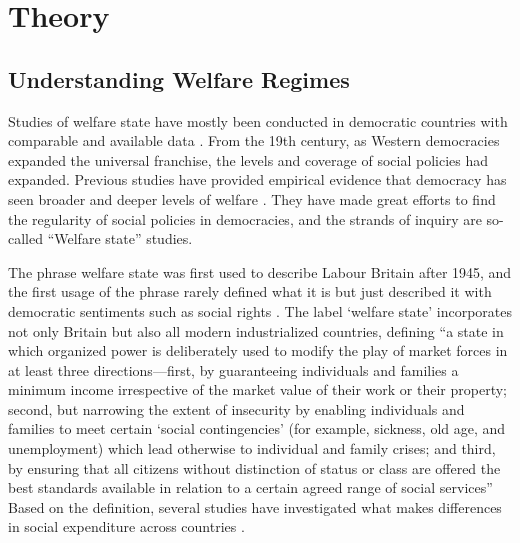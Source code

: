 \documentclass[11pt]{article}
\begin{document}
\section{Theory} 
\subsection{Understanding Welfare Regimes} 
Studies of welfare state have mostly been conducted in democratic countries with comparable and available data \citep{Jessop1984, Gosta1989, Gosta1990, Rudra2005, Huber2008, Hudson2009}. From the 19th century, as Western democracies expanded the universal franchise, the levels and coverage of social policies had expanded. Previous studies have provided empirical evidence that democracy has seen broader and deeper levels of welfare \citep{Acemoglu2000, Lindert2005}. They have made great efforts to find the regularity of social policies in democracies, and the strands of inquiry are so-called ``Welfare state'' studies.\par

The phrase welfare state was first used to describe Labour Britain after 1945, and the first usage of the phrase rarely defined what it is but just described it with democratic sentiments such as social rights \citep[9-10]{Briggs1961}. The label ‘welfare state’ incorporates not only Britain but also all modern industrialized countries, defining “a state in which organized power is deliberately used to modify the play of market forces in at least three directions---first, by guaranteeing individuals and families a minimum income irrespective of the market value of their work or their property; second, but narrowing the extent of insecurity by enabling individuals and families to meet certain ‘social contingencies’ (for example, sickness, old age, and unemployment) which lead otherwise to individual and family crises; and third, by ensuring that all citizens without distinction of status or class are offered the best standards available in relation to a certain agreed range of social services” \citep[14]{Briggs1961} Based on the definition, several studies have investigated what makes differences in social expenditure across countries \citep{Cameron1978, Rodrik1998, Adsera2002}.\par
\end{document}
